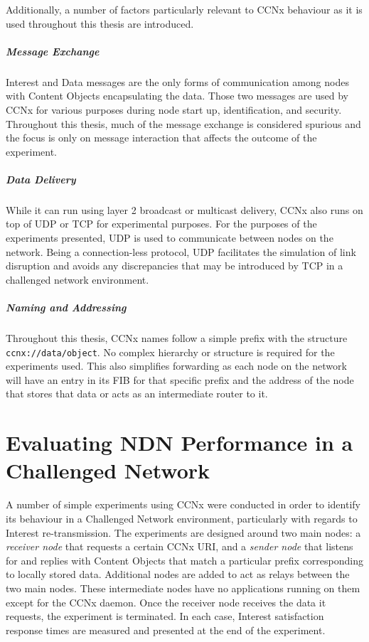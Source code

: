 \documentclass[a4paper,12pt]{report}      %
\begin{document}
\noindent Additionally, a number of factors particularly relevant to CCNx behaviour as it is used throughout this thesis are introduced.

\paragraph{Message Exchange} Interest and Data messages are the only forms of communication among nodes
with Content Objects encapsulating the data. Those two messages are used by CCNx for various purposes during node start up, 
identification, and security. Throughout this thesis, much of the message exchange is considered spurious and the focus is only
 on message interaction that affects the outcome of the experiment. 

\paragraph{Data Delivery} While it can run using layer 2 broadcast or multicast delivery, CCNx also
runs on top of UDP or TCP for experimental purposes. For the purposes of the experiments presented, UDP is used to
communicate between nodes on the network. Being a connection-less protocol, UDP facilitates the simulation of link disruption and avoids any discrepancies that may be introduced by TCP in a challenged network environment. 

\paragraph{Naming and Addressing} Throughout this thesis, CCNx names follow a simple prefix with the structure \verb!ccnx://data/object!. No complex hierarchy or structure is required for the experiments used. This also simplifies forwarding as each
node on the network will have an entry in its FIB for that specific prefix and the address of the node
that stores that data or acts as an intermediate router to it.


\pagebreak
\chapter{Evaluating NDN Performance in a Challenged Network}

A number of simple experiments using CCNx were conducted in order to identify its behaviour in a Challenged Network environment, particularly with regards to Interest re-transmission. The experiments are designed around two main nodes: a \emph{receiver node} that requests a certain CCNx URI, and a \emph{sender node} that listens for and replies with Content Objects that match a particular prefix corresponding to locally stored data. Additional nodes are added to act as relays between the two main nodes. These intermediate nodes have no applications running on them except for the CCNx daemon. Once the receiver node receives the data it requests, the experiment is terminated. In each case, Interest satisfaction response times are measured and presented at the end of the experiment.
\end{document}
